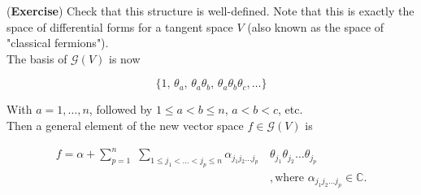 \noindent (\textbf{Exercise}) Check that this structure is well-defined. Note that this is exactly the space of differential forms for a tangent space $V$ (also known as the space of "classical fermions"). \\

\noindent The basis of $\mathcal{G} (V)$ is now 

\begin{equation}
\{ 1, \, \theta_a, \, \theta_a \theta_b, \, \theta_a \theta_b \theta_c, \dots \}
\end{equation}

\noindent With $a=1,\dots,n$, followed by $1 \le a < b \le n$, $a < b < c$, etc. \\

\noindent Then a general element of the new vector space $f \in \mathcal{G} (V)$ is

\begin{align}
f = \alpha + \sum_{p=1}^n \,\, \sum_{1 \le j_1 < \dots < j_p \le n} \alpha_{j_1 j_2 \dots j_p} \, &\theta_{j_1} \theta_{j_2} \dots \theta_{j_p} \\
&, \text{where} \,\, \alpha_{j_1 j_2 \dots j_p} \in \mathbb{C}.
\end{align}